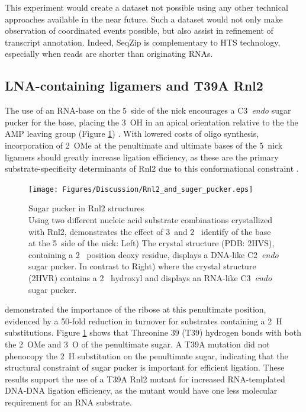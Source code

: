     This experiment would create a dataset not possible using any other technical approaches available in the near future. Such a dataset would not only make observation of coordinated events possible, but also assist in refinement of transcript annotation. Indeed, SeqZip is complementary to HTS technology, especially when reads are shorter than originating RNAs.

  \subsection{LNA-containing ligamers and T39A Rnl2}
    \label{Disc:subsec:LNA-Containing ligamers and T39A Rnk2}

    The use of an RNA-base on the 5\textprime~side of the nick encourages a C3\textprime~\textit{endo} sugar pucker for the base, placing the 3\textprime~OH in an apical orientation relative to the the AMP leaving group (Figure \ref{Disc:fig:Rnl2 and suger pucker}) \citep{Nandakumar2006}. With lowered costs of oligo synthesis, incorporation of 2\textprime~OMe at the penultimate and ultimate bases of the 5\textprime~nick ligamers should greatly increase ligation efficiency, as these are the primary substrate-specificity determinants of Rnl2 due to this conformational constraint \citep{Nandakumar2004a, Nandakumar2006}.

    \begin{figure} %
      \centering 
      \texttt{[image: Figures/Discussion/Rnl2\_and\_suger\_pucker.eps]}
      \caption[Sugar pucker in Rnl2 structures]
      {Sugar pucker in Rnl2 structures \\[0.25cm]
        Using two different nucleic acid substrate combinations crystallized with Rnl2, \citet{Nandakumar2006} demonstrates the effect of 3\textprime~and 2\textprime~ identify of the base at the 5\textprime~side of the nick: Left) The crystal structure (PDB: 2HVS), containing a 2\textprime~ position deoxy residue, displays a DNA-like C2\textprime~\textit{endo} sugar pucker. In contrast to Right) where the crystal structure (2HVR) contains a 2\textprime~ hydroxyl and displays an RNA-like C3\textprime~\textit{endo} sugar pucker.
        }
        \label{Disc:fig:Rnl2 and suger pucker}
        \end{figure}

    \citet{Nandakumar2004a} demonstrated the importance of the ribose at this penultimate position, evidenced by a 50-fold reduction in turnover for substrates containing a 2\textprime~H substitutions. Figure \ref{Disc:fig:Rnl2 and suger pucker} shows that Threonine 39 (T39) hydrogen bonds with both the 2\textprime~OMe and 3\textprime~O of the penultimate sugar. A T39A mutation did not phenocopy the 2\textprime~H substitution on the penultimate sugar, indicating that the structural constraint of sugar pucker is important for efficient ligation. These results support the use of a T39A Rnl2 mutant for increased RNA-templated DNA-DNA ligation efficiency, as the mutant would have one less molecular requirement for an RNA substrate.

